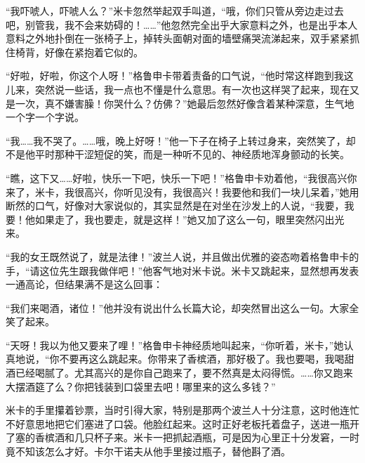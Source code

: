\par “我吓唬人，吓唬人么？”米卡忽然举起双手叫道，“哦，你们只管从旁边走过去吧，别管我，我不会来妨碍的！……”他忽然完全出乎大家意料之外，也是出乎本人意料之外地扑倒在一张椅子上，掉转头面朝对面的墙壁痛哭流涕起来，双手紧紧抓住椅背，好像在紧抱着它似的。
\par “好啦，好啦，你这个人呀！”格鲁申卡带着责备的口气说，“他时常这样跑到我这儿来，突然说一些话，我一点也不懂是什么意思。有一次也这样哭了起来，现在又是一次，真不嫌害臊！你哭什么？仿佛？”她最后忽然好像含着某种深意，生气地一个字一个字说。
\par “我……我不哭了。……哦，晚上好呀！”他一下子在椅子上转过身来，突然笑了，却不是他平时那种干涩短促的笑，而是一种听不见的、神经质地浑身颤动的长笑。
\par “瞧，这下又……好啦，快乐一下吧，快乐一下吧！”格鲁申卡劝着他，“我很高兴你来了，米卡，我很高兴，你听见没有，我很高兴！我要他和我们一块儿呆着，”她用断然的口气，好像对大家说似的，其实显然是在对坐在沙发上的人说，“我要，我要！他如果走了，我也要走，就是这样！”她又加了这么一句，眼里突然闪出光来。
\par “我的女王既然说了，就是法律！”波兰人说，并且做出优雅的姿态吻着格鲁申卡的手，“请这位先生跟我做伴吧！”他客气地对米卡说。米卡又跳起来，显然想再发表一通高论，但结果满不是这么回事：
\par “我们来喝酒，诸位！”他并没有说出什么长篇大论，却突然冒出这么一句。大家全笑了起来。
\par “天呀！我以为他又要来了哩！”格鲁申卡神经质地叫起来，“你听着，米卡，”她认真地说，“你不要再这么跳起来。你带来了香槟酒，那好极了。我也要喝，我喝甜酒已经喝腻了。尤其高兴的是你自己跑来了，要不然真是太闷得慌。……你又跑来大摆酒筵了么？你把钱装到口袋里去吧！哪里来的这么多钱？”
\par 米卡的手里攥着钞票，当时引得大家，特别是那两个波兰人十分注意，这时他连忙不好意思地把它们塞进了口袋。他脸红起来。这时正好老板托着盘子，送进一瓶开了塞的香槟酒和几只杯子来。米卡一把抓起酒瓶，可是因为心里正十分发窘，一时竟不知该怎么才好。卡尔干诺夫从他手里接过瓶子，替他斟了酒。
